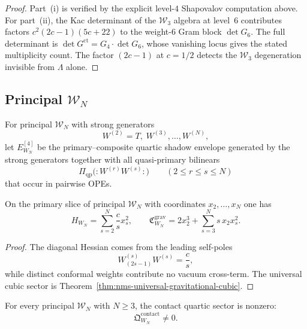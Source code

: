 \begin{proof}
Part~(i) is verified by the explicit level-$4$ Shapovalov computation above.
For part~(ii), the Kac determinant of the $\mathcal W_3$ algebra at level~$6$ contributes
factors $c^2(2c-1)(5c+22)$ to the weight-$6$ Gram block $\det G_6$.
The full determinant is $\det G^{\mathrm{ct}} = G_4 \cdot \det G_6$,
whose vanishing locus gives the stated multiplicity count.
The factor $(2c-1)$ at $c = 1/2$ detects the $\mathcal W_3$
degeneration invisible from $\Lambda$ alone.
\end{proof}

\subsection{Principal \texorpdfstring{$\mathcal W_N$}{WN}}
\label{subsec:nms-principal-wn}

\begin{definition}
\label{def:nms-principal-wn-envelope}
For principal $\mathcal W_N$ with strong generators
\[
W^{(2)}=T,\;W^{(3)},\dots,W^{(N)},
\]
let $E_{W_N}^{[4]}$ be the primary--composite quartic shadow envelope generated by the strong generators together with all quasi-primary bilinears
\[
\Pi_{\mathrm{qp}}\bigl(:W^{(r)}W^{(s)}:\bigr)
\qquad (2\le r\le s\le N)
\]
that occur in pairwise OPEs.
\end{definition}

\begin{theorem}
\label{thm:nms-principal-wn-hessian-cubic}
On the primary slice of principal $\mathcal W_N$ with coordinates $x_2,\dots,x_N$ one has
\[
H_{W_N}=\sum_{s=2}^N\frac{c}{s}x_s^2,
\qquad
\mathfrak C^{\mathrm{grav}}_{W_N}=2x_2^3+\sum_{s=3}^N s\,x_2x_s^2.
\]
\end{theorem}

\begin{proof}
The diagonal Hessian comes from the leading self-poles
\[
W^{(s)}_{(2s-1)}W^{(s)}=\frac cs,
\]
while distinct conformal weights contribute no vacuum cross-term. The universal cubic sector is Theorem~\ref{thm:nms-universal-gravitational-cubic}.\qedhere
\end{proof}

\begin{theorem}
\label{thm:nms-principal-wn-contact-nonvanishing}
For every principal $\mathcal W_N$ with $N\ge 3$, the contact quartic sector is nonzero:
\[
\mathfrak Q_{W_N}^{\mathrm{contact}}\neq 0.
\]
\end{theorem}

